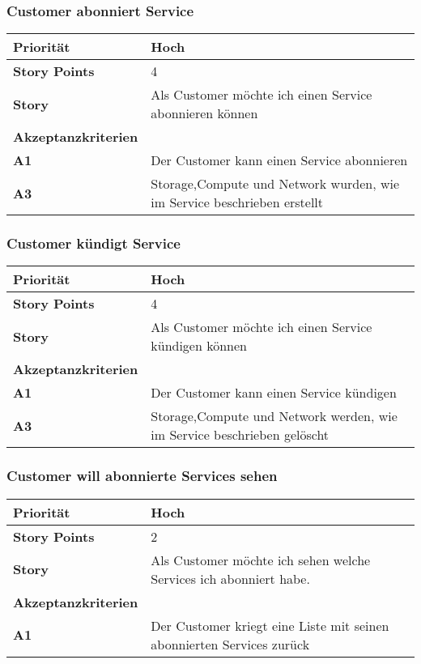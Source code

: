  \subsubsection{Customer abonniert Service}
\begin{tabularx}{\linewidth}{l X}
  \textbf{Priorität} & Hoch\\
  \hline
  \textbf{Story Points} & 4\\
  \hline
  \textbf{Story}& Als Customer möchte ich einen Service abonnieren können\\
  \hline
    \textbf{Akzeptanzkriterien} & \\
    \hline
  \textbf{A1} & Der Customer kann einen Service abonnieren\\
  \hline
    \textbf{A3} & Storage,Compute und Network wurden, wie im Service beschrieben erstellt\\
  \hline

   \end{tabularx}
 \subsubsection{Customer kündigt Service}
 \begin{tabularx}{\linewidth}{l X}
     \textbf{Priorität} & Hoch\\
  \hline
  \textbf{Story Points} & 4\\
  \hline
  \textbf{Story}& Als Customer möchte ich einen Service kündigen können\\
  \hline
    \textbf{Akzeptanzkriterien} & \\
    \hline
  \textbf{A1} & Der Customer kann einen Service kündigen\\
  \hline
    \textbf{A3} & Storage,Compute und Network werden, wie im Service beschrieben gelöscht\\
  \hline
   \end{tabularx}

\subsubsection{Customer will abonnierte Services sehen}
\begin{tabularx}{\linewidth}{l X}
  \textbf{Priorität} & Hoch\\
  \hline
  \textbf{Story Points} & 2\\
  \hline
  \textbf{Story}& Als Customer möchte ich sehen welche Services ich abonniert habe.\\
  \hline
    \textbf{Akzeptanzkriterien} & \\
    \hline
  \textbf{A1} & Der Customer kriegt eine Liste mit seinen abonnierten Services zurück\\
  \hline
   \end{tabularx}
   
